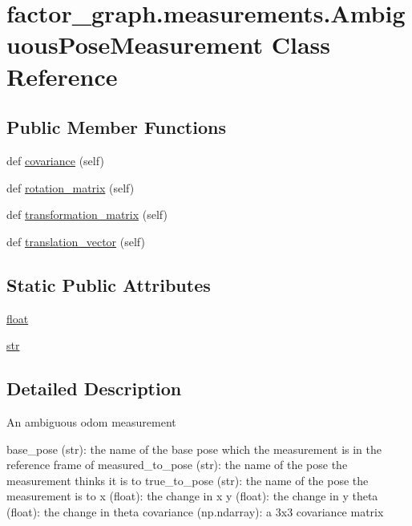 \hypertarget{classfactor__graph_1_1measurements_1_1AmbiguousPoseMeasurement}{}\section{factor\+\_\+graph.\+measurements.\+Ambiguous\+Pose\+Measurement Class Reference}
\label{classfactor__graph_1_1measurements_1_1AmbiguousPoseMeasurement}
\subsection*{Public Member Functions}
\begin{DoxyCompactItemize}
\item
def \hyperlink{classfactor__graph_1_1measurements_1_1AmbiguousPoseMeasurement_a9f058846f2c616f54b1dde166ead9aa3}{covariance} (self)
\item
def \hyperlink{classfactor__graph_1_1measurements_1_1AmbiguousPoseMeasurement_a949af6a01f25c603c7f446c1946c5cbd}{rotation\+\_\+matrix} (self)
\item
def \hyperlink{classfactor__graph_1_1measurements_1_1AmbiguousPoseMeasurement_a3003d89f4ca1e76240510dfa25977a83}{transformation\+\_\+matrix} (self)
\item
def \hyperlink{classfactor__graph_1_1measurements_1_1AmbiguousPoseMeasurement_a8d1a2a3bffefbbc4af410e69bc6106ae}{translation\+\_\+vector} (self)
\end{DoxyCompactItemize}
\subsection*{Static Public Attributes}
\begin{DoxyCompactItemize}
\item
\hyperlink{classfactor__graph_1_1measurements_1_1AmbiguousPoseMeasurement_a5ce6dba9300f6b616eebd5be084af4e1}{float}
\item
\hyperlink{classfactor__graph_1_1measurements_1_1AmbiguousPoseMeasurement_a2129bfabf24a0886f92f4a9065746bd6}{str}
\end{DoxyCompactItemize}


\subsection{Detailed Description}
\begin{DoxyVerb}An ambiguous odom measurement

base_pose (str): the name of the base pose which the measurement is in the
    reference frame of
measured_to_pose (str): the name of the pose the measurement thinks it is to
true_to_pose (str): the name of the pose the measurement is to
x (float): the change in x
y (float): the change in y
theta (float): the change in theta
covariance (np.ndarray): a 3x3 covariance matrix
\end{DoxyVerb}


